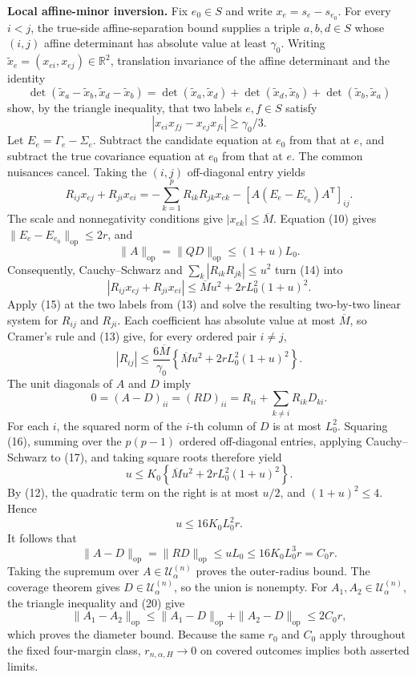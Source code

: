 \textbf{Local affine-minor inversion.}
Fix \(e_0\in S\) and write \(x_e=s_e-s_{e_0}\). For every \(i<j\), the true-side affine-separation bound supplies a triple \(a,b,d\in S\) whose \((i,j)\) affine determinant has absolute value at least \(\gamma_0\). Writing \(\widetilde x_e=(x_{ei},x_{ej})\in\mathbb R^2\), translation invariance of the affine determinant and the identity
\[
\det(\widetilde x_a-\widetilde x_b,
\widetilde x_d-\widetilde x_b)
=\det(\widetilde x_a,\widetilde x_d)
+\det(\widetilde x_d,\widetilde x_b)
+\det(\widetilde x_b,\widetilde x_a)
\]
show, by the triangle inequality, that two labels \(e,f\in S\) satisfy
\[
|x_{ei}x_{fj}-x_{ej}x_{fi}|\geq\gamma_0/3.
\tag{13}
\]
Let \(E_e=\Gamma_e-\Sigma_e\). Subtract the candidate equation at \(e_0\) from that at \(e\), and subtract the true covariance equation at \(e_0\) from that at \(e\). The common nuisances cancel. Taking the \((i,j)\) off-diagonal entry yields
\[
R_{ij}x_{ej}+R_{ji}x_{ei}
=-\sum_{k=1}^pR_{ik}R_{jk}x_{ek}
-[A(E_e-E_{e_0})A^{\mathsf T}]_{ij}.
\tag{14}
\]
The scale and nonnegativity conditions give \(|x_{ek}|\leq\overline M\). Equation (10) gives \(\|E_e-E_{e_0}\|_{\mathrm{op}}\leq2r\), and
\[
\|A\|_{\mathrm{op}}=\|QD\|_{\mathrm{op}}
\leq(1+u)L_0.
\]
Consequently, Cauchy--Schwarz and \(\sum_k|R_{ik}R_{jk}|\leq u^2\) turn (14) into
\[
|R_{ij}x_{ej}+R_{ji}x_{ei}|
\leq\overline M u^2+2rL_0^2(1+u)^2.
\tag{15}
\]
Apply (15) at the two labels from (13) and solve the resulting two-by-two linear system for \(R_{ij}\) and \(R_{ji}\). Each coefficient has absolute value at most \(\overline M\), so Cramer's rule and (13) give, for every ordered pair \(i\neq j\),
\[
|R_{ij}|
\leq\frac{6\overline M}{\gamma_0}
\left\{\overline M u^2+2rL_0^2(1+u)^2\right\}.
\tag{16}
\]
The unit diagonals of \(A\) and \(D\) imply
\[
0=(A-D)_{ii}=(RD)_{ii}
=R_{ii}+\sum_{k\neq i}R_{ik}D_{ki}.
\tag{17}
\]
For each \(i\), the squared norm of the \(i\)-th column of \(D\) is at most \(L_0^2\). Squaring (16), summing over the \(p(p-1)\) ordered off-diagonal entries, applying Cauchy--Schwarz to (17), and taking square roots therefore yield
\[
u\leq K_0
\left\{\overline M u^2+2rL_0^2(1+u)^2\right\}.
\tag{18}
\]
By (12), the quadratic term on the right is at most \(u/2\), and \((1+u)^2\leq4\). Hence
\[
u\leq16K_0L_0^2r.
\tag{19}
\]
It follows that
\[
\|A-D\|_{\mathrm{op}}
=\|RD\|_{\mathrm{op}}
\leq uL_0
\leq16K_0L_0^3r
=C_0r.
\tag{20}
\]
Taking the supremum over \(A\in\mathcal U^{(n)}_\alpha\) proves the outer-radius bound. The coverage theorem gives \(D\in\mathcal U^{(n)}_\alpha\), so the union is nonempty. For \(A_1,A_2\in\mathcal U^{(n)}_\alpha\), the triangle inequality and (20) give
\[
\|A_1-A_2\|_{\mathrm{op}}
\leq\|A_1-D\|_{\mathrm{op}}+\|A_2-D\|_{\mathrm{op}}
\leq2C_0r,
\]
which proves the diameter bound. Because the same \(r_0\) and \(C_0\) apply throughout the fixed four-margin class, \(r_{n,\alpha,H}\to0\) on covered outcomes implies both asserted limits.